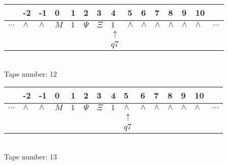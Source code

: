 \documentclass{article}
\begin{document}
\begin{table}[H]
\centering
\begin{tabular}{lllllllllllllll}
 & -2 & -1 & 0 & 1 & 2 & 3 & 4 & 5 & 6 & 7 & 8 & 9 & 10 & \\
\hline
$...$ & \multicolumn{1}{|l|}{$\wedge$} & \multicolumn{1}{|l|}{$\wedge$} & \multicolumn{1}{|l|}{$M$} & \multicolumn{1}{|l|}{$1$} & \multicolumn{1}{|l|}{$\Psi$} & \multicolumn{1}{|l|}{$\Xi$} & \multicolumn{1}{|l|}{$1$} & \multicolumn{1}{|l|}{$\wedge$} & \multicolumn{1}{|l|}{$\wedge$} & \multicolumn{1}{|l|}{$\wedge$} & \multicolumn{1}{|l|}{$\wedge$} & \multicolumn{1}{|l|}{$\wedge$} & \multicolumn{1}{|l|}{$\wedge$} & $...$\\
\hline
&  &  &  &  &  &  & $\uparrow$ &  &  &  &  &  &  &  \\
&  &  &  &  &  &  & $ q7 $ &  &  &  &  &  &  &  \\
\end{tabular}
\\
Tape number: 12
\noindent\makebox[\linewidth]{\hdashrule{\textwidth}{1pt}{1pt}}\end{table}

\begin{table}[H]
\centering
\begin{tabular}{lllllllllllllll}
 & -2 & -1 & 0 & 1 & 2 & 3 & 4 & 5 & 6 & 7 & 8 & 9 & 10 & \\
\hline
$...$ & \multicolumn{1}{|l|}{$\wedge$} & \multicolumn{1}{|l|}{$\wedge$} & \multicolumn{1}{|l|}{$M$} & \multicolumn{1}{|l|}{$1$} & \multicolumn{1}{|l|}{$\Psi$} & \multicolumn{1}{|l|}{$\Xi$} & \multicolumn{1}{|l|}{$1$} & \multicolumn{1}{|l|}{$\wedge$} & \multicolumn{1}{|l|}{$\wedge$} & \multicolumn{1}{|l|}{$\wedge$} & \multicolumn{1}{|l|}{$\wedge$} & \multicolumn{1}{|l|}{$\wedge$} & \multicolumn{1}{|l|}{$\wedge$} & $...$\\
\hline
&  &  &  &  &  &  &  & $\uparrow$ &  &  &  &  &  &  \\
&  &  &  &  &  &  &  & $ q7 $ &  &  &  &  &  &  \\
\end{tabular}
\\
Tape number: 13
\noindent\makebox[\linewidth]{\hdashrule{\textwidth}{1pt}{1pt}}\end{table}
\clearpage
\end{document}
